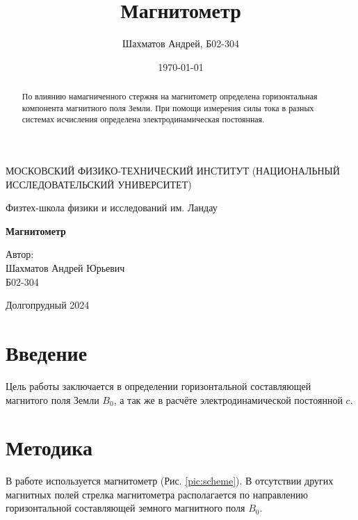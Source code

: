 \documentclass[12pt]{article}
\title{Магнитометр}
\author{Шахматов Андрей, Б02-304}
\date{\today}
\begin{document}
\begin{titlepage}
    \begin{center}
        {\large МОСКОВСКИЙ ФИЗИКО-ТЕХНИЧЕСКИЙ ИНСТИТУТ (НАЦИОНАЛЬНЫЙ ИССЛЕДОВАТЕЛЬСКИЙ УНИВЕРСИТЕТ)}
    \end{center}
    \begin{center}
        {\large Физтех-школа физики и исследований им. Ландау}
    \end{center}

    \vspace{3cm}
    {\huge
        \begin{center}
            \textbf{Магнитометр}
        \end{center}
    }
    \vspace{2cm}
    \begin{flushright}
        {\LARGE Автор:\\ Шахматов Андрей Юрьевич \\
            \vspace{0.2cm}
            Б02-304}
    \end{flushright}
    \vspace{7 cm}
    \begin{center}
        Долгопрудный 2024
    \end{center}
    \thispagestyle{empty}
\end{titlepage}


\begin{abstract}
    По влиянию намагниченного стержня на магнитометр определена горизонтальная компонента магнитного поля Земли. При помощи измерения 
    силы тока в разных системах исчисления определена электродинамическая постоянная.
\end{abstract}


\section{Введение}
Цель работы заключается в определении горизонтальной составляющей магнитого поля Земли $B_0$, а так же в 
расчёте электродинамической постоянной $c$.

\section{Методика}
В работе используется магнитометр (Рис. \ref{pic:scheme}). В отсутствии других магнитных полей 
стрелка магнитометра располагается по направлению горизонтальной 
составляющей земного магнитного поля $B_0$. 
 
\end{document}
